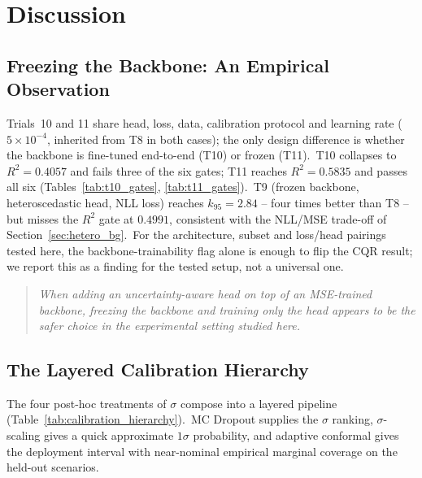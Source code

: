 
\chapter{Discussion}\label{chapter:discussion}

\section{Freezing the Backbone: An Empirical Observation}\label{sec:freeze_principle}

Trials~10 and 11 share head, loss, data, calibration protocol and learning rate ($5\times10^{-4}$, inherited from T8 in both cases); the only design difference is whether the backbone is fine-tuned end-to-end (T10) or frozen (T11).\ T10 collapses to $R^2 = 0.4057$ and fails three of the six gates; T11 reaches $R^2 = 0.5835$ and passes all six (Tables~\ref{tab:t10_gates}, \ref{tab:t11_gates}).\ T9 (frozen backbone, heteroscedastic head, NLL loss) reaches $k_{95} = 2.84$ -- four times better than T8 -- but misses the $R^2$ gate at $0.4991$, consistent with the NLL/MSE trade-off of Section~\ref{sec:hetero_bg}.\ For the architecture, subset and loss/head pairings tested here, the backbone-trainability flag alone is enough to flip the CQR result; we report this as a finding for the tested setup, not a universal one.

\begin{quote}\itshape
When adding an uncertainty-aware head on top of an MSE-trained backbone, freezing the backbone and training only the head appears to be the safer choice in the experimental setting studied here.
\end{quote}

\section{The Layered Calibration Hierarchy}\label{sec:calibration_hierarchy}

The four post-hoc treatments of $\sigma$ compose into a layered pipeline (Table~\ref{tab:calibration_hierarchy}).\ MC Dropout supplies the $\sigma$ ranking, $\sigma$-scaling gives a quick approximate $1\sigma$ probability, and adaptive conformal gives the deployment interval with near-nominal empirical marginal coverage on the held-out scenarios.


